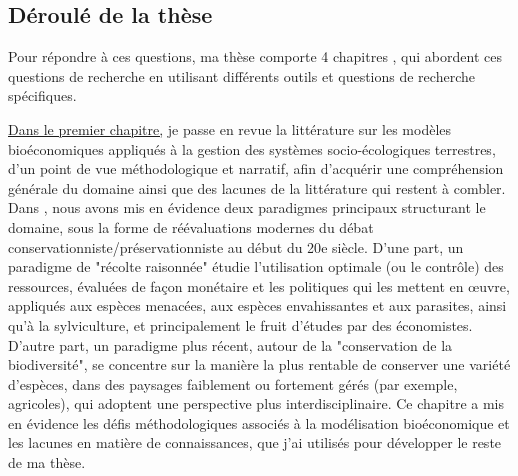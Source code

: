 {}
\subsection*{Déroulé de la thèse}


 
Pour répondre à ces questions, ma thèse comporte 4 chapitres , qui abordent ces questions de recherche en utilisant différents outils et questions de recherche spécifiques. 

\hyperref[chapter1]{Dans le premier chapitre,} je passe en revue la littérature sur les modèles bioéconomiques appliqués à la gestion des systèmes socio-écologiques terrestres, d'un point de vue méthodologique et narratif, afin d'acquérir une compréhension générale du domaine ainsi que des lacunes de la littérature qui restent à combler. Dans \citep{jean_bioeconomic_2022}, nous avons mis en évidence deux paradigmes principaux structurant le domaine, sous la forme de réévaluations modernes du débat conservationniste/préservationniste \citep{Banzhaf2019} au début du 20$\mathrm{e}$ siècle. D'une part, un paradigme de "récolte raisonnée" étudie l'utilisation optimale (ou le contrôle) des ressources, évaluées de façon monétaire et les politiques qui les mettent en œuvre, appliqués aux espèces menacées, aux espèces envahissantes et aux parasites, ainsi qu'à la sylviculture, et principalement le fruit d'études par des économistes. D'autre part, un paradigme plus récent, autour de la "conservation de la biodiversité", se concentre sur la manière la plus rentable de conserver une variété d'espèces, dans des paysages faiblement ou fortement gérés (par exemple, agricoles), qui adoptent une perspective plus interdisciplinaire. Ce chapitre a mis en évidence les défis méthodologiques associés à la modélisation bioéconomique et les lacunes en matière de connaissances, que j'ai utilisés pour développer le reste de ma thèse.
\\


\begin{table}[H]
\centering
{}
\caption{Distribution thématique des chapitres}
\end{table}

